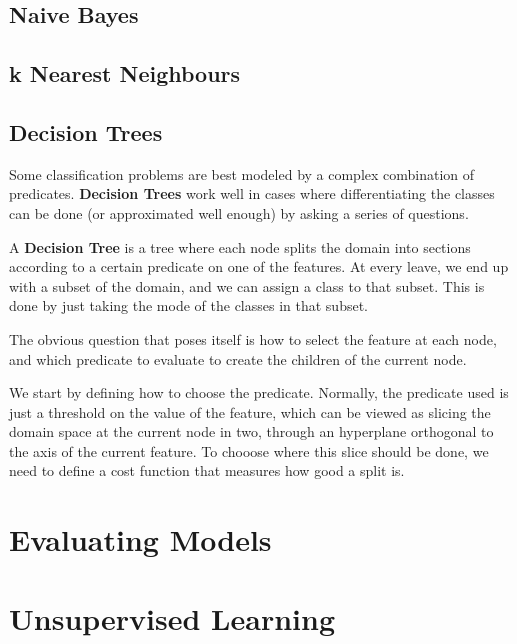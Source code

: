 \documentclass{article}
\begin{document}
\subsection{Naive Bayes}

\subsection{k Nearest Neighbours}

\subsection{Decision Trees}

Some classification problems are best modeled by a complex combination of predicates.
\textbf{Decision Trees} work well in cases where differentiating the classes can be done (or approximated well enough) by asking a series of questions.

A \textbf{Decision Tree} is a tree where each node splits the domain into sections according to a certain predicate on one of the features.
At every leave, we end up with a subset of the domain, and we can assign a class to that subset.
This is done by just taking the mode of the classes in that subset.

The obvious question that poses itself is how to select the feature at each node, and which predicate to evaluate to create the children of the current node.

We start by defining how to choose the predicate.
Normally, the predicate used is just a threshold on the value of the feature, which can be viewed as slicing the domain space at the current node in two, through an hyperplane orthogonal to the axis of the current feature.
To chooose where this slice should be done, we need to define a cost function that measures how good a split is.

\section{Evaluating Models}

\section{Unsupervised Learning}
\end{document}
